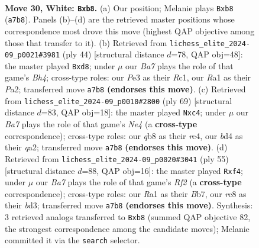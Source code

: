 \documentclass[11pt]{article}
\begin{document}
\clearpage

\begin{figure}[p]\centering
\begin{subfigure}{0.46\textwidth}\centering
\resizebox{\linewidth}{!}{%
\newchessgame
\chessboard[
  setfen={1qr5/Bp3pk1/p3p3/8/3b3p/4PP2/PP4PP/R3R1K1 w - - 0 30},
  showmover=false,
  pgfstyle=straightmove, color=movearrow, markmove={a7-b8}
]}
\caption{}
\end{subfigure}\hfill
\begin{subfigure}{0.46\textwidth}\centering
\resizebox{\linewidth}{!}{%
\newchessgame
\chessboard[
  setfen={3q2k1/pp4p1/4r3/2b4p/1P4nB/5r2/P4PP1/2R2RK1 w - - 0 23},
  showmover=false,
  pgfstyle=straightmove, color=movearrow, markmove={h4-d8}
]}
\caption{}
\end{subfigure}
\\[4pt]
\begin{subfigure}{0.46\textwidth}\centering
\resizebox{\linewidth}{!}{%
\newchessgame
\chessboard[
  setfen={r4r1k/2p3pp/8/4n3/pPR5/2P1P2P/Q4pP1/2B2K2 b - - 1 35},
  showmover=false,
  pgfstyle=straightmove, color=movearrow, markmove={e5-c4}
]}
\caption{}
\end{subfigure}\hfill
\begin{subfigure}{0.46\textwidth}\centering
\resizebox{\linewidth}{!}{%
\newchessgame
\chessboard[
  setfen={r6k/1b3r1p/p2p4/1p6/5Q2/3B3R/PPP4P/2K5 b - - 0 28},
  showmover=false,
  pgfstyle=straightmove, color=movearrow, markmove={f7-f4}
]}
\caption{}
\end{subfigure}
\caption{\textbf{Move 30, White: \texttt{Bxb8}.} (a) Our position; Melanie plays \texttt{Bxb8} (\texttt{a7b8}). Panels (b)--(d) are the retrieved master positions whose correspondence most drove this move (highest QAP objective among those that transfer to it). (b) Retrieved from \texttt{lichess\_elite\_2024-09\_p0021\#3981} (ply 44) [structural distance $d$=78, QAP obj=48]: the master played \texttt{Bxd8}; under $\mu$ our \emph{Ba7} plays the role of that game's \emph{Bh4}; cross-type roles: our \emph{P}e3 as their \emph{R}c1, our \emph{R}a1 as their \emph{P}a2; transferred move \texttt{a7b8} \textbf{(endorses this move)}. (c) Retrieved from \texttt{lichess\_elite\_2024-09\_p0010\#2800} (ply 69) [structural distance $d$=83, QAP obj=18]: the master played \texttt{Nxc4}; under $\mu$ our \emph{Ba7} plays the role of that game's \emph{Ne4} (a \textbf{cross-type} correspondence); cross-type roles: our \emph{q}b8 as their \emph{r}c4, our \emph{b}d4 as their \emph{q}a2; transferred move \texttt{a7b8} \textbf{(endorses this move)}. (d) Retrieved from \texttt{lichess\_elite\_2024-09\_p0020\#3041} (ply 55) [structural distance $d$=88, QAP obj=16]: the master played \texttt{Rxf4}; under $\mu$ our \emph{Ba7} plays the role of that game's \emph{Rf2} (a \textbf{cross-type} correspondence); cross-type roles: our \emph{R}a1 as their \emph{B}b7, our \emph{r}c8 as their \emph{b}d3; transferred move \texttt{a7b8} \textbf{(endorses this move)}. Synthesis: 3 retrieved analogs transferred to \texttt{Bxb8} (summed QAP objective 82, the strongest correspondence among the candidate moves); Melanie committed it via the \texttt{search} selector.}
\label{fig:thought-m58}
\end{figure}
\end{document}
